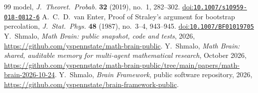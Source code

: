 \documentclass[11pt]{amsart}
\theoremstyle{remark}
\newcommand{\doi}[1]{\href{https://doi.org/#1}{doi:\nolinkurl{#1}}}
\begin{document}
\begin{thebibliography}{99}
model, \emph{J.\ Theoret.\ Probab.} \textbf{32} (2019), no.~1, 282--302. \doi{10.1007/s10959-018-0812-6}
 A.~C.~D.~van Enter, Proof of Straley's argument for bootstrap percolation, \emph{J.\ Stat.\ Phys.}
\textbf{48} (1987), no.~3--4, 943--945. \doi{10.1007/BF01019705}
 Y.~Shmalo, \emph{Math Brain: public snapshot, code and tests}, 2026,
\url{https://github.com/yspennstate/math-brain-public}.
 Y.~Shmalo, \emph{Math Brain: shared, auditable memory for multi-agent mathematical research},
October 2026, \url{https://github.com/yspennstate/math-brain-public/tree/main/papers/math-brain-2026-10-24}.
 Y.~Shmalo, \emph{Brain Framework}, public software repository, 2026,
\url{https://github.com/yspennstate/brain-framework-public}.
\end{thebibliography}
\end{document}
